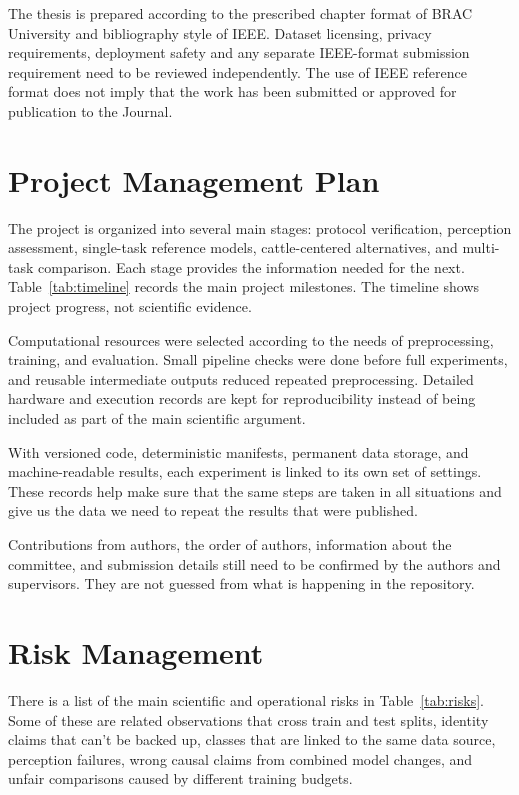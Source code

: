 The thesis is prepared according to the prescribed chapter format of BRAC University and bibliography style of IEEE. Dataset licensing, privacy requirements, deployment safety and any separate IEEE-format submission requirement need to be reviewed independently. The use of IEEE reference format does not imply that the work has been submitted or approved for publication to the Journal.

\section{Project Management Plan}

The project is organized into several main stages: protocol verification, perception assessment, single-task reference models, cattle-centered alternatives, and multi-task comparison. Each stage provides the information needed for the next. Table~\ref{tab:timeline} records the main project milestones. The timeline shows project progress, not scientific evidence.



Computational resources were selected according to the needs of preprocessing, training, and evaluation. Small pipeline checks were done before full experiments, and reusable intermediate outputs reduced repeated preprocessing. Detailed hardware and execution records are kept for reproducibility instead of being included as part of the main scientific argument.

With versioned code, deterministic manifests, permanent data storage, and machine-readable results, each experiment is linked to its own set of settings. These records help make sure that the same steps are taken in all situations and give us the data we need to repeat the results that were published.

Contributions from authors, the order of authors, information about the committee, and submission details still need to be confirmed by the authors and supervisors. They are not guessed from what is happening in the repository.

\section{Risk Management}

There is a list of the main scientific and operational risks in Table~\ref{tab:risks}. Some of these are related observations that cross train and test splits, identity claims that can't be backed up, classes that are linked to the same data source, perception failures, wrong causal claims from combined model changes, and unfair comparisons caused by different training budgets.

